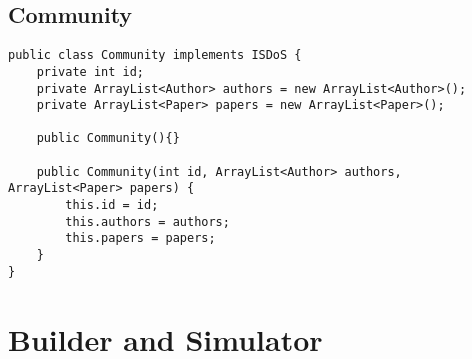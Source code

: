 \subsection{Community}
\begin{lstlisting}
public class Community implements ISDoS {
	private int id;
	private ArrayList<Author> authors = new ArrayList<Author>();
	private ArrayList<Paper> papers = new ArrayList<Paper>();
	
	public Community(){}

	public Community(int id, ArrayList<Author> authors, ArrayList<Paper> papers) {
		this.id = id;
		this.authors = authors;
		this.papers = papers;
	}
}
\end{lstlisting}

\section{Builder and Simulator}
